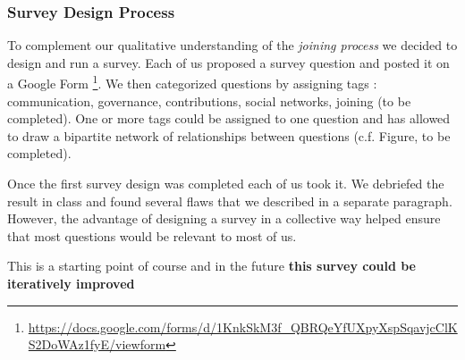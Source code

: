 \subsubsection{Survey Design Process}
To complement our qualitative understanding of the {\it joining process} we decided to design and run a survey. Each of us proposed a survey question and posted it on a Google Form \footnote{\url{https://docs.google.com/forms/d/1KnkSkM3f_QBRQeYfUXpyXspSqavjcClKS2DoWAz1fyE/viewform}}. We then categorized questions by assigning tags : communication, governance, contributions, social networks, joining (to be completed). One or more tags could be assigned to one question and has allowed to draw a bipartite network of relationships between questions (c.f. Figure, to be completed).

Once the first survey design was completed each of us took it. We debriefed the result in class and found several flaws that we described in a separate paragraph. However, the advantage of designing a survey in a collective way helped ensure that most questions would be relevant to most of us.

This is a starting point of course and in the future {\bf this survey could be iteratively improved}

